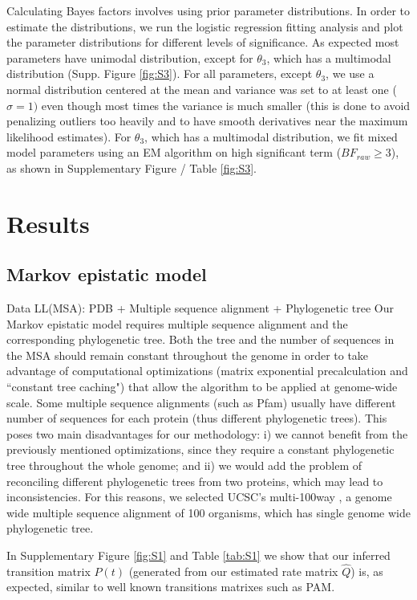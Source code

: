 Calculating Bayes factors involves using prior parameter distributions. In order to estimate the distributions, we run the logistic regression fitting analysis and plot the parameter distributions for different levels of significance. As expected most parameters have unimodal distribution, except for $\theta_3$, which has a multimodal distribution (Supp. Figure \ref{fig:S3}). For all parameters, except $\theta_3$, we use a normal distribution centered at the mean and variance was set to at least one ($\sigma=1)$ even though most times the variance is much smaller (this is done to avoid penalizing outliers too heavily and to have smooth derivatives near the maximum likelihood estimates). For $\theta_3$, which has a multimodal distribution, we fit mixed model parameters using an EM algorithm on high significant term ($BF_{raw} \ge 3$), as shown in Supplementary Figure / Table \ref{fig:S3}. 

\section{Results}

\subsection{Markov epistatic model}

Data LL(MSA): PDB + Multiple sequence alignment + Phylogenetic tree
Our Markov epistatic model requires multiple sequence alignment and the corresponding phylogenetic tree. Both the tree and the number of sequences in the MSA should remain constant throughout the genome in order to take advantage of computational optimizations (matrix exponential precalculation and ``constant tree caching") that allow the algorithm to be applied at genome-wide scale. Some multiple sequence alignments (such as Pfam) usually have different number of sequences for each protein (thus different phylogenetic trees). This poses two main disadvantages for our methodology: i) we cannot benefit from the previously mentioned optimizations, since they require a constant phylogenetic tree throughout the whole genome; and ii) we would add the problem of reconciling different phylogenetic trees from two proteins, which may lead to inconsistencies. For this reasons, we selected UCSC’s multi-100way \cite{karolchik2014ucsc}, a genome wide multiple sequence alignment of 100 organisms, which has single genome wide phylogenetic tree.

In Supplementary Figure \ref{fig:S1} and Table \ref{tab:S1} we show that our inferred transition matrix $P(t)$ (generated from our estimated rate matrix $\hat{Q}$) is, as expected, similar to well known transitions matrixes such as PAM.

